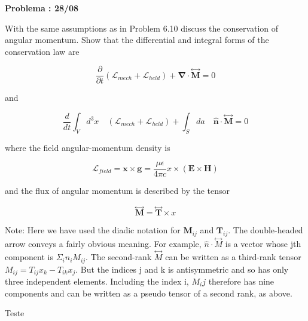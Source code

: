 \color{blue}

\textbf{Problema \paragraphnum: 28/08}
	
	With the same assumptions as in Problem 6.10 discuss the conservation of angular momentum. Show that the differential and integral forms of the conservation law are
	
	\begin{equation*}
		\frac{\partial}{\partial t}(\mathcal{L}_{mech} + \mathcal{L}_{held}) + \mathbf{\nabla} \cdot \overset{\leftrightarrow}{\textbf{M}} = 0
	\end{equation*}
	
	and
	
	\begin{equation*}
		\frac{d}{dt} \int_V d^3x\quad(\mathcal{L}_{mech} + \mathcal{L}_{held}) + \int_S da\quad \hat{\textbf{n}}\cdot \overset{\leftrightarrow}{\textbf{M}} = 0
	\end{equation*}
	
	where the field angular-momentum density is
	
	\begin{equation*}
		\mathcal{L}_{field} = \textbf{x} \times \textbf{g} = \frac{\mu \epsilon}{4\pi c} x \times (\textbf{E} \times \textbf{H})
	\end{equation*}
	
	and the flux of angular momentum is described by the tensor
	
	\begin{equation*}
		\overset{\leftrightarrow}{\textbf{M}} = \overset{\leftrightarrow}{\textbf{T}} \times x
	\end{equation*}
	
	Note: Here we have used the diadic notation for $\textbf{M}_{ij}$ and $\textbf{T}_{ij}$. The double-headed arrow conveys a fairly obvious meaning. For example, $\hat{n} \cdot \overset{\leftrightarrow}{M}$ is a vector whose jth component is $\Sigma_i n_i M_{ij}$. The second-rank $\overset{\leftrightarrow}{M}$ can be written as a third-rank tensor $M_{ij} = T_{ij}x_k - T_{ik}x_j$. But the indices j and k is antisymmetric and so has only three independent elements. Including the index i, $M_ij$ therefore has nine components and can be written as a pseudo tensor of a second rank, as above.

\color{black}
\bigskip

Teste
